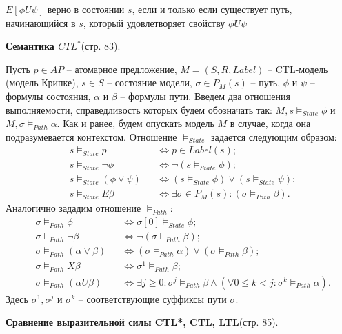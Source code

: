 \documentclass[a4paper,12pt]{article}
\begin{document}
$E[\phi U \psi]$ верно в состоянии $s$, если и только если существует путь,
начинающийся в $s$, который удовлетворяет свойству $\phi U \psi$

\textbf{Семантика $CTL^*$}(стр. 83).

Пусть $p \in AP$ -- атомарное
предложение, $M = (S, R, Label)$ -- CTL-модель (модель Крипке), $s \in S$ --
состояние модели, $\sigma \in P_M(s)$ -- путь, $\phi$ и $\psi$ -- формулы состояния, $\alpha$ и $\beta$
-- формулы пути. Введем два отношения выполняемости,
справедливость которых будем обозначать так: $M, s \vDash_{State} \phi$ и
$M, \sigma \vDash_{Path} \alpha$.
Как и ранее, будем опускать модель $M$ в случае, когда она
подразумевается контекстом.
Отношение $\vDash_{State}$ задается следующим образом:
\begin{align*}
    &s\vDash_{State} p &&\Leftrightarrow p \in Label(s);\\
    &s\vDash_{State} \lnot \phi &&\Leftrightarrow \lnot (s\vDash_{State} \phi);\\
    &s\vDash_{State} (\phi \vee \psi) &&\Leftrightarrow (s\vDash_{State} \phi) \vee (s\vDash_{State} \psi);\\
    &s\vDash_{State} E \beta &&\Leftrightarrow \exists \sigma \in P_M(s): (\sigma\vDash_{Path} \beta).
\end{align*}
Аналогично зададим отношение $\vDash_{Path}$:
\begin{align*}
    &\sigma \vDash_{Path} \phi &&\Leftrightarrow \sigma[0]\vDash_{State} \phi;\\
    &\sigma \vDash_{Path} \lnot \beta &&\Leftrightarrow \lnot (\sigma\vDash_{Path} \beta);\\
    &\sigma \vDash_{Path} (\alpha \vee \beta) &&\Leftrightarrow (\sigma\vDash_{Path} \alpha) \vee (\sigma\vDash_{Path} \beta);\\
    &\sigma \vDash_{Path} X \beta &&\Leftrightarrow \sigma^1\vDash_{Path} \beta;\\
    &\sigma \vDash_{Path} (\alpha U \beta) &&\Leftrightarrow \exists j \ge 0: \sigma^j\vDash_{Path} \beta \wedge (\forall 0 \le k < j: \sigma^k\vDash_{Path} \alpha).
\end{align*}
Здесь $\sigma^1, \sigma^j$ и $\sigma^k$ -- соответствующие суффиксы пути $\sigma$.

\textbf{Сравнение выразительной силы CTL*, CTL, LTL}(стр. 85).
\end{document}
